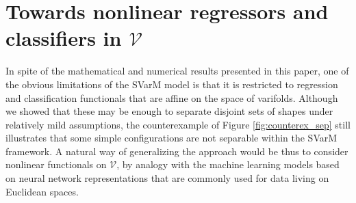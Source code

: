 \documentclass[11pt]{article}
\begin{document}
\section{Towards nonlinear regressors and classifiers in $\mathcal{V}$}
In spite of the mathematical and numerical results presented in this paper, one of the obvious limitations of the SVarM model is that it is restricted to regression and classification functionals that are affine on the space of varifolds. Although we showed that these may be enough to separate disjoint sets of shapes under relatively mild assumptions, the counterexample of Figure \ref{fig:counterex_sep} still illustrates that some simple configurations are not separable within the SVarM framework. A natural way of generalizing the approach would be thus to consider nonlinear functionals on $\mathcal{V}$, by analogy with the machine learning models based on neural network representations that are commonly used for data living on Euclidean spaces.
\end{document}
